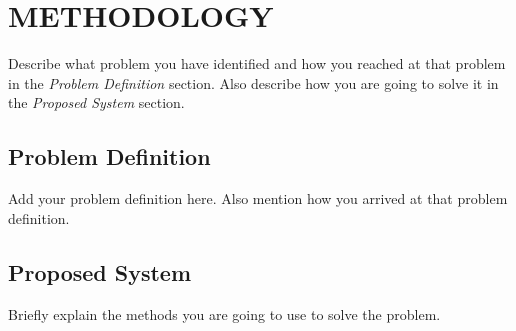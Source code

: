 \chapter{METHODOLOGY}
\par Describe what problem you have identified and how you reached at that 
problem in the \emph{Problem Definition} section.
Also describe how you are going to solve it in the \emph{Proposed System} 
section.

\section{Problem Definition}
\par Add your problem definition here. Also mention how you arrived at that 
problem definition.

\section{Proposed System}
\par Briefly explain the methods you are going to use to solve the problem.
\newpage
